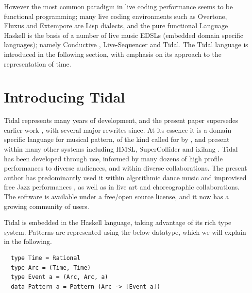\documentclass[authoryear]{sigplanconf}
\begin{document}
However the most common paradigm in live coding performance seems to
be functional programming; many live coding environments such as
Overtone, Fluxus and Extempore are Lisp dialects, and the pure
functional Language Haskell is the basis of a number of live music
EDSLs (embedded domain specific languages); namely Conductive
\citep{Bell11}, Live-Sequencer \citep{Thielemann12} and Tidal. The
Tidal language is introduced in the following section, with emphasis
on its approach to the representation of time.

\section{Introducing Tidal}


Tidal represents many years of development, and the present paper
supersedes earlier work \citep{McLean10d}, with several major rewrites
since. At its essence it is a domain specific language for musical
pattern, of the kind called for by \citet{Spiegel81}, and present
within many other systems including HMSL, SuperCollider
\citep{McCartney02} and ixilang \citep{Magnusson11b}. Tidal has been
developed through use, informed by many dozens of high profile
performances to diverse audiences, and within diverse
collaborations. The present author has predominantly used it within
algorithmic dance music \citep[algorave; ]{Collins14} and improvised
free Jazz performances \citep{Hession14}, as well as in live art
\citep{McLean12a} and choreographic \citep{Sicchio14}
collaborations. The software is available under a free/open source
license, and it now has a growing community of users.

Tidal is embedded in the Haskell language, taking advantage of its
rich type system. Patterns are represented using the below datatype,
which we will explain in the following.

\begin{center}
\begin{minipage}{0.5\textwidth}
\begin{lstlisting}
  type Time = Rational
  type Arc = (Time, Time)
  type Event a = (Arc, Arc, a)
  data Pattern a = Pattern (Arc -> [Event a])
\end{lstlisting}
\end{minipage}
\end{center}
\end{document}
